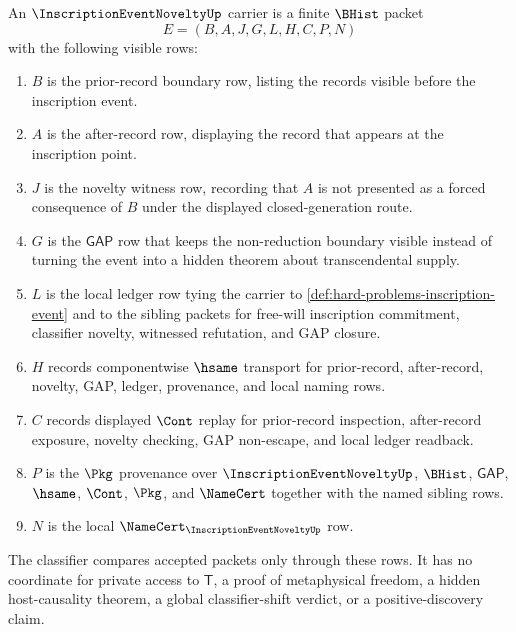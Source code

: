 \begin{definition}
\label{def:inscription-event-novelty-carrier}
An $\InscriptionEventNoveltyUp$ carrier is a finite $\BHist$ packet
$$
E=(B,A,J,G,L,H,C,P,N)
$$
with the following visible rows:
\begin{enumerate}
\item $B$ is the prior-record boundary row, listing the records visible before the inscription event.
\item $A$ is the after-record row, displaying the record that appears at the inscription point.
\item $J$ is the novelty witness row, recording that $A$ is not presented as a forced consequence of $B$ under the displayed closed-generation route.
\item $G$ is the $\mathsf{GAP}$ row that keeps the non-reduction boundary visible instead of turning the event into a hidden theorem about transcendental supply.
\item $L$ is the local ledger row tying the carrier to \autoref{def:hard-problems-inscription-event} and to the sibling packets for free-will inscription commitment, classifier novelty, witnessed refutation, and GAP closure.
\item $H$ records componentwise $\hsame$ transport for prior-record, after-record, novelty, GAP, ledger, provenance, and local naming rows.
\item $C$ records displayed $\Cont$ replay for prior-record inspection, after-record exposure, novelty checking, GAP non-escape, and local ledger readback.
\item $P$ is the $\Pkg$ provenance over $\InscriptionEventNoveltyUp$, $\BHist$, $\mathsf{GAP}$, $\hsame$, $\Cont$, $\Pkg$, and $\NameCert$ together with the named sibling rows.
\item $N$ is the local $\NameCert_{\InscriptionEventNoveltyUp}$ row.
\end{enumerate}
The classifier compares accepted packets only through these rows. It has no coordinate for private access to $\mathsf{T}$, a proof of metaphysical freedom, a hidden host-causality theorem, a global classifier-shift verdict, or a positive-discovery claim.
\end{definition}

